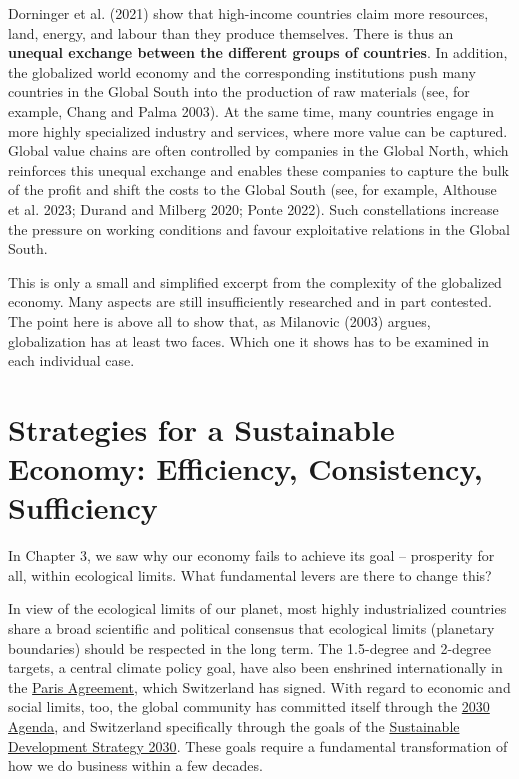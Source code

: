 \documentclass[
  british,
  a4paper,
  DIV=11,
  numbers=noendperiod,
  oneside,
  openany]{scrreprt}
\begin{document}
Dorninger et al. (2021) show that high-income countries claim more
resources, land, energy, and labour than they produce themselves. There
is thus an \textbf{unequal exchange between the different groups of
countries}. In addition, the globalized world economy and the
corresponding institutions push many countries in the Global South into
the production of raw materials (see, for example, Chang and Palma
2003). At the same time, many countries engage in more highly
specialized industry and services, where more value can be captured.
Global value chains are often controlled by companies in the Global
North, which reinforces this unequal exchange and enables these
companies to capture the bulk of the profit and shift the costs to the
Global South (see, for example, Althouse et al. 2023; Durand and Milberg
2020; Ponte 2022). Such constellations increase the pressure on working
conditions and favour exploitative relations in the Global South.

This is only a small and simplified excerpt from the complexity of the
globalized economy. Many aspects are still insufficiently researched and
in part contested. The point here is above all to show that, as
Milanovic (2003) argues, globalization has at least two faces. Which one
it shows has to be examined in each individual case.

\chapter{Strategies for a Sustainable Economy: Efficiency, Consistency,
Sufficiency}\label{strategies-for-a-sustainable-economy-efficiency-consistency-sufficiency}

\begin{tcolorbox}[enhanced jigsaw, arc=.35mm, bottomrule=.15mm, bottomtitle=1mm, breakable, colback=white, colbacktitle=quarto-callout-note-color!10!white, colframe=quarto-callout-note-color-frame, coltitle=black, left=2mm, leftrule=.75mm, opacityback=0, opacitybacktitle=0.6, rightrule=.15mm, title={Guiding question}, titlerule=0mm, toprule=.15mm, toptitle=1mm]

In Chapter 3, we saw why our economy fails to achieve its goal --
prosperity for all, within ecological limits. What fundamental levers
are there to change this?

\end{tcolorbox}

In view of the ecological limits of our planet, most highly
industrialized countries share a broad scientific and political
consensus that ecological limits (planetary boundaries) should be
respected in the long term. The 1.5-degree and 2-degree targets, a
central climate policy goal, have also been enshrined internationally in
the \href{https://www.fedlex.admin.ch/eli/fga/2017/81/en}{Paris
Agreement}, which Switzerland has signed. With regard to economic and
social limits, too, the global community has committed itself through
the \href{https://sdgs.un.org/2030agenda}{2030 Agenda}, and Switzerland
specifically through the goals of the
\href{https://www.are.admin.ch/are/en/home/sustainable-development/strategy/sds.html}{Sustainable
Development Strategy 2030}. These goals require a fundamental
transformation of how we do business within a few decades.
\end{document}

